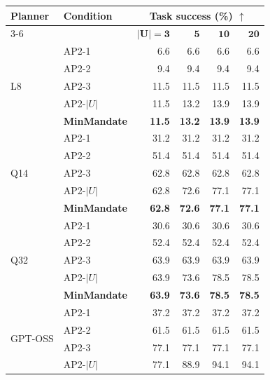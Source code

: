 \documentclass[letterpaper]{article}
\begin{document}
\begin{MMFullWidthTable}
\centering
\begin{minipage}[t]{0.555\textwidth}
\vspace{0pt}
\centering
\fontsize{10pt}{10.6pt}\selectfont
\setlength{\tabcolsep}{1.8pt}
\renewcommand{\arraystretch}{0.94}
\begin{tabular*}{\linewidth}{@{\extracolsep{\fill}}llrrrr@{}}
\toprule
\multirow{2}{*}{\textbf{Planner}} &
\multirow{2}{*}{\textbf{Condition}} &
\multicolumn{4}{c}{\textbf{Task success (\%) \(\uparrow\)}} \\
\cmidrule(lr){3-6}
& & \(\boldsymbol{\lvert U\rvert=3}\) & \(\boldsymbol{5}\) &
\(\boldsymbol{10}\) & \(\boldsymbol{20}\) \\
\midrule
\multirow{5}{*}{L8}
& AP2-1 & 6.6 & 6.6 & 6.6 & 6.6 \\
& AP2-2 & 9.4 & 9.4 & 9.4 & 9.4 \\
& AP2-3 & 11.5 & 11.5 & 11.5 & 11.5 \\
& AP2-\(\lvert U\rvert\) & 11.5 & 13.2 & 13.9 & 13.9 \\
& \textbf{MinMandate} & \textbf{11.5} & \textbf{13.2} & \textbf{13.9} & \textbf{13.9} \\
\midrule
\multirow{5}{*}{Q14}
& AP2-1 & 31.2 & 31.2 & 31.2 & 31.2 \\
& AP2-2 & 51.4 & 51.4 & 51.4 & 51.4 \\
& AP2-3 & 62.8 & 62.8 & 62.8 & 62.8 \\
& AP2-\(\lvert U\rvert\) & 62.8 & 72.6 & 77.1 & 77.1 \\
& \textbf{MinMandate} & \textbf{62.8} & \textbf{72.6} & \textbf{77.1} & \textbf{77.1} \\
\midrule
\multirow{5}{*}{Q32}
& AP2-1 & 30.6 & 30.6 & 30.6 & 30.6 \\
& AP2-2 & 52.4 & 52.4 & 52.4 & 52.4 \\
& AP2-3 & 63.9 & 63.9 & 63.9 & 63.9 \\
& AP2-\(\lvert U\rvert\) & 63.9 & 73.6 & 78.5 & 78.5 \\
& \textbf{MinMandate} & \textbf{63.9} & \textbf{73.6} & \textbf{78.5} & \textbf{78.5} \\
\midrule
\multirow{5}{*}{GPT-OSS}
& AP2-1 & 37.2 & 37.2 & 37.2 & 37.2 \\
& AP2-2 & 61.5 & 61.5 & 61.5 & 61.5 \\
& AP2-3 & 77.1 & 77.1 & 77.1 & 77.1 \\
& AP2-\(\lvert U\rvert\) & 77.1 & 88.9 & 94.1 & 94.1 \\

\end{tabular*}
\end{minipage}
\end{MMFullWidthTable}
\end{document}
